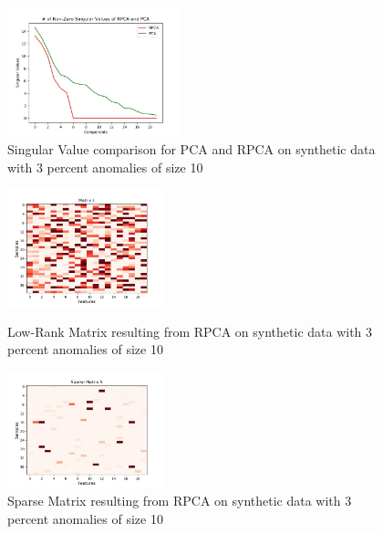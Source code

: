 \documentclass[conference]{IEEEtran}
\begin{document}
\begin{figure}[H]
    \centering
    \includegraphics[width=50mm, scale=0.5]{Singular_Value_Plot_Test_120AnomSize10.jpg}
    \caption{Singular Value comparison for PCA and RPCA on synthetic data with 3 percent anomalies of size 10}
    \label{fig:singvaltrain12010}
\end{figure}
\begin{figure}[H]
\begin{minipage}[b]{0.45\linewidth}
    \centering
    \includegraphics[width=45mm, scale=0.5]{L_120AnomSize10.jpg}
    \caption{Low-Rank Matrix resulting from RPCA on synthetic data with 3 percent anomalies of size 10}
    \label{fig:Ltrain12010}
\end{minipage}
\quad
\begin{minipage}[b]{0.45\linewidth}
    \includegraphics[width=45mm, scale=0.5]{S_120AnomSize10.jpg}
    \caption{Sparse Matrix resulting from RPCA on synthetic data with 3 percent anomalies of size 10}
    \label{fig:Strain12010}
\end{minipage}
\end{figure}
\end{document}
